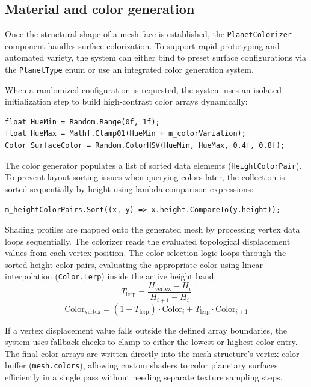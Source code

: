 \documentclass[12pt]{report}
\begin{document}
\subsection{Material and color generation}

Once the structural shape of a mesh face is established, the \texttt{PlanetColorizer} component handles surface colorization. To support rapid prototyping and automated variety, the system can either bind to preset surface configurations via the \texttt{PlanetType} enum or use an integrated color generation system.

When a randomized configuration is requested, the system uses an isolated initialization step to build high-contrast color arrays dynamically:
\begin{verbatim}
float HueMin = Random.Range(0f, 1f);
float HueMax = Mathf.Clamp01(HueMin + m_colorVariation);
Color SurfaceColor = Random.ColorHSV(HueMin, HueMax, 0.4f, 0.8f);
\end{verbatim}
The color generator populates a list of sorted data elements (\texttt{HeightColorPair}). To prevent layout sorting issues when querying colors later, the collection is sorted sequentially by height using lambda comparison expressions:
\begin{verbatim}
m_heightColorPairs.Sort((x, y) => x.height.CompareTo(y.height));
\end{verbatim}

Shading profiles are mapped onto the generated mesh by processing vertex data loops sequentially. The colorizer reads the evaluated topological displacement values from each vertex position. The color selection logic loops through the sorted height-color pairs, evaluating the appropriate color using linear interpolation (\texttt{Color.Lerp}) inside the active height band:
\begin{equation}
T_{\text{lerp}} = \frac{H_{\text{vertex}} - H_i}{H_{i+1} - H_i}
\end{equation}
\begin{equation}
\text{Color}_{\text{vertex}} = (1 - T_{\text{lerp}}) \cdot \text{Color}_i + T_{\text{lerp}} \cdot \text{Color}_{i+1}
\end{equation}

If a vertex displacement value falls outside the defined array boundaries, the system uses fallback checks to clamp to either the lowest or highest color entry. The final color arrays are written directly into the mesh structure's vertex color buffer (\texttt{mesh.colors}), allowing custom shaders to color planetary surfaces efficiently in a single pass without needing separate texture sampling steps.
\end{document}
